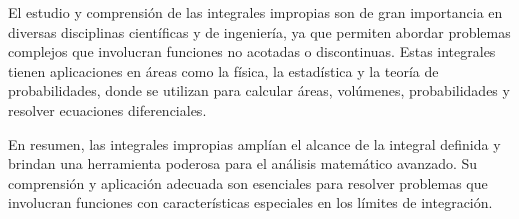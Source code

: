 \documentclass{article}
\begin{document}
El estudio y comprensión de las integrales impropias son de gran importancia en diversas disciplinas científicas y de ingeniería, ya que permiten abordar problemas complejos que involucran funciones no acotadas o discontinuas. Estas integrales tienen aplicaciones en áreas como la física, la estadística y la teoría de probabilidades, donde se utilizan para calcular áreas, volúmenes, probabilidades y resolver ecuaciones diferenciales.

En resumen, las integrales impropias amplían el alcance de la integral definida y brindan una herramienta poderosa para el análisis matemático avanzado. Su comprensión y aplicación adecuada son esenciales para resolver problemas que involucran funciones con características especiales en los límites de integración.
\end{document}
